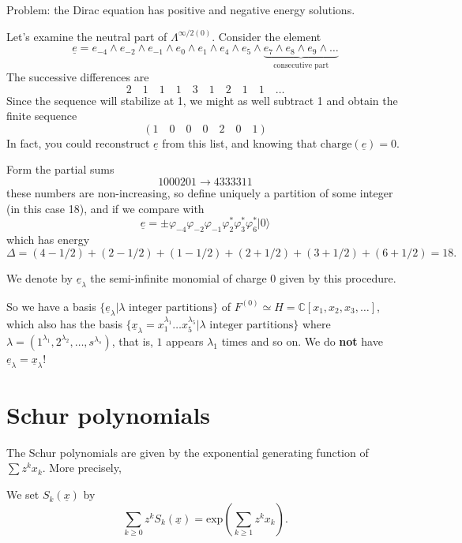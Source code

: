 Problem: the Dirac equation has positive and negative
energy solutions.

\medskip\noindent
Let's examine the neutral part
of $\Lambda^{\infty/2(0)}$.
Consider the element
$$
\underline{e}=e_{-4}\wedge e_{-2}\wedge e_{-1}
\wedge e_0 \wedge e_1 \wedge e_4 \wedge e_5
\wedge\underbrace{ e_7 \wedge e_8 \wedge e_9\wedge\ldots
}_{\text{consecutive part}}
$$
The successive differences are
$$
2\quad 1 \quad  1\quad 1 \quad 3 \quad 1 \quad 2 \quad 1
\quad  1 \quad  \ldots
$$
Since the sequence will stabilize at 1,
we might as well subtract 1 and obtain the finite
sequence 
$$
(1\quad 0\quad 0\quad 0\quad 2\quad 0\quad 1)
$$
In fact, you could reconstruct $\underline{e}$ 
from this list, and knowing that
$\text{charge}(\underline{e})=0$.

Form the partial sums
$$
1000201 \to 4333311
$$
these numbers are non-increasing,
so define uniquely a partition of some integer
(in this case 18), 
and if we compare with
$$
\underline{e}=\pm \varphi_{-4}\varphi_{-2}\varphi_{-1}
\varphi^*_2\varphi_3^*\varphi_6^*|0\rangle
$$
which has energy
$$
\Delta=(4-1/2)+(2-1/2)+(1-1/2)
+(2+1/2)+(3+1/2)+(6+1/2)=18.
$$

\noindent
We denote by $\underline{e}_\lambda$ 
the semi-infinite monomial of charge 0 given by
this procedure.

\medskip\noindent
So we have a basis
$\{\underline{e}_\lambda|\lambda\text{ integer partitions}\}$
of $F^{(0)}\simeq H = \mathbb{C}[x_1,x_2,x_3,\ldots]$,
which also has the basis
$\{\underline{x}_\lambda=x_1^{\lambda_1}\ldots x_5^{\lambda_5}|
\lambda \text{ integer partitions}\}$
where $\lambda=(1^{\lambda_1},2^{\lambda_2},\ldots,s^{\lambda_s})$,
that is, $1$ appears $\lambda_1$ times and so on.
We do {\bf not} have $\underline{e}_\lambda=\underline{x}_\lambda$!

\section{Schur polynomials}
\label{section-schur-polynomials}

The Schur polynomials are given by
the exponential generating function of $\sum z^kx_k$.
More precisely,

\begin{definition}
\label{definition-schur-polynomial}
We set  $S_k(\underline{x})$ by
$$
\sum_{k \geq 0}z^k S_k(\underline{x})
=\text{exp}\left(\sum_{k \geq 1}z^k x_k\right).
$$
\end{definition}

